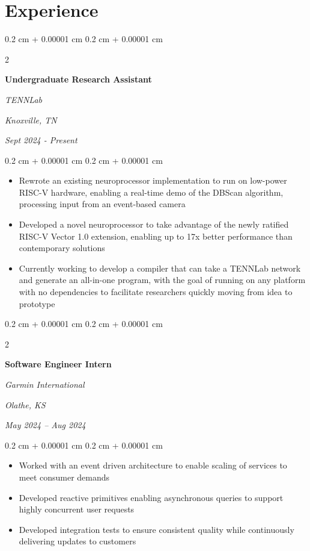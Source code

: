 \documentclass[10pt, letterpaper]{article}
\newenvironment{highlights}{
    \begin{itemize}[
        topsep=0.10 cm,
        parsep=0.10 cm,
        partopsep=0pt,
        itemsep=0pt,
        leftmargin=0.4 cm + 10pt
    ]
}{
    \end{itemize}
} %
\newenvironment{onecolentry}{
    \begin{adjustwidth}{
        0.2 cm + 0.00001 cm
    }{
        0.2 cm + 0.00001 cm
    }
}{
    \end{adjustwidth}
} %
\newenvironment{twocolentry}[2][]{
    \onecolentry
    \def\secondColumn{#2}
    \setcolumnwidth{\fill, 4.5 cm}
    \begin{paracol}{2}
}{
    \switchcolumn \raggedleft \secondColumn
    \end{paracol}
    \endonecolentry
} %
\begin{document}
    \section{Experience}
        \begin{twocolentry}{
        \textit{Knoxville, TN}

        \textit{Sept 2024 - Present}}
            \textbf{Undergraduate Research Assistant}

            \textit{TENNLab}
        \end{twocolentry}

        \vspace{0.10 cm}
        \begin{onecolentry}
            \begin{highlights}
                \item Rewrote an existing neuroprocessor implementation to run on low-power RISC-V hardware, enabling a real-time demo of the DBScan algorithm, processing input from an event-based camera
                \item Developed a novel neuroprocessor to take advantage of the newly ratified RISC-V Vector 1.0 extension, enabling up to 17x better performance than contemporary solutions
                \item Currently working to develop a compiler that can take a TENNLab network and generate an all-in-one program, with the goal of running on any platform with no dependencies to facilitate researchers quickly moving from idea to prototype
            \end{highlights}
        \end{onecolentry}


        \vspace{0.2 cm}

        \begin{twocolentry}{
        \textit{Olathe, KS}

        \textit{May 2024 – Aug 2024}}
            \textbf{Software Engineer Intern}

            \textit{Garmin International}
        \end{twocolentry}

        \vspace{0.10 cm}
        \begin{onecolentry}
            \begin{highlights}
                \item Worked with an event driven architecture to enable scaling of services to meet consumer demands
                \item Developed reactive primitives enabling asynchronous queries to support highly concurrent user requests
                \item Developed integration tests to ensure consistent quality while continuously delivering updates to customers
            \end{highlights}
        \end{onecolentry}
\end{document}
